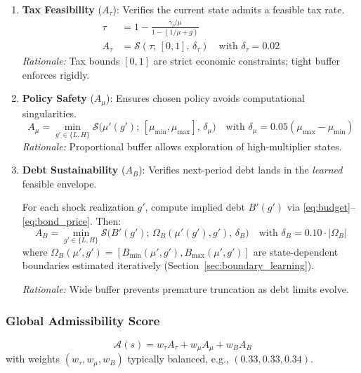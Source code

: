 \begin{enumerate}
    \item \textbf{Tax Feasibility} ($A_\tau$): Verifies the current state admits a feasible tax rate.
    \begin{align}
        \tau &= 1 - \frac{\gamma_l / \mu}{1 - (1/\mu + g)} \\
        A_\tau &= \mathcal{S}(\tau;\, [0, 1],\, \delta_\tau) \quad \text{with } \delta_\tau = 0.02
    \end{align}
    \textit{Rationale:} Tax bounds $[0,1]$ are strict economic constraints; tight buffer enforces rigidly.

    \item \textbf{Policy Safety} ($A_\mu$): Ensures chosen policy avoids computational singularities.
    \begin{equation}
        A_\mu = \min_{g' \in \{L, H\}} \mathcal{S}\bigl(\mu'(g');\, [\mu_{\min}, \mu_{\max}],\, \delta_\mu\bigr) \quad \text{with } \delta_\mu = 0.05(\mu_{\max} - \mu_{\min})
    \end{equation}
    \textit{Rationale:} Proportional buffer allows exploration of high-multiplier states.

    \item \textbf{Debt Sustainability} ($A_B$): Verifies next-period debt lands in the \textit{learned} feasible envelope.
    
    For each shock realization $g'$, compute implied debt $B'(g')$ via \eqref{eq:budget}--\eqref{eq:bond_price}. Then:
    \begin{equation}
        A_B = \min_{g' \in \{L, H\}} \mathcal{S}\bigl(B'(g');\, \Omega_B(\mu'(g'), g'),\, \delta_B\bigr) \quad \text{with } \delta_B = 0.10 \cdot |\Omega_B|
    \end{equation}
    where $\Omega_B(\mu', g') = [B_{\min}(\mu', g'), B_{\max}(\mu', g')]$ are state-dependent boundaries estimated iteratively (Section~\ref{sec:boundary_learning}).
    
    \textit{Rationale:} Wide buffer prevents premature truncation as debt limits evolve.
\end{enumerate}

\subsubsection{Global Admissibility Score}
\begin{equation}\label{eq:global_score}
    \mathcal{A}(s) = w_\tau A_\tau + w_\mu A_\mu + w_B A_B
\end{equation}
with weights $(w_\tau, w_\mu, w_B)$ typically balanced, e.g., $(0.33, 0.33, 0.34)$.


